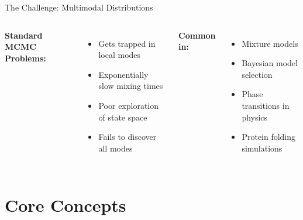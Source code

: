 \documentclass[aspectratio=169]{beamer}
\begin{document}
\begin{frame}{The Challenge: Multimodal Distributions}
    \begin{columns}
        \textbf{Standard MCMC Problems:}
        \begin{itemize}
            \item Gets trapped in local modes
            \item Exponentially slow mixing times
            \item Poor exploration of state space
            \item Fails to discover all modes
        \end{itemize}

        \vspace{0.5cm}
        \textbf{Common in:}
        \begin{itemize}
            \item Mixture models
            \item Bayesian model selection
            \item Phase transitions in physics
            \item Protein folding simulations
        \end{itemize}


    \end{columns}
\end{frame}


\section{Core Concepts}
\end{document}
